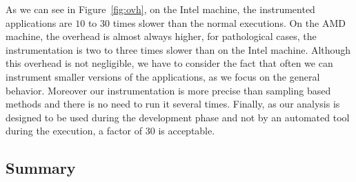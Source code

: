 
As we can see in Figure~\ref{fig:ovh}, on the Intel machine,
the instrumented applications are $10$ to $30$ times slower than the normal
executions. On the AMD machine, the overhead is almost always higher, for
pathological cases, the instrumentation is two to three times slower than on
the Intel machine.
Although this overhead is not negligible, we have to consider the fact that often we can instrument
smaller versions of the applications, as we focus on the general behavior.
Moreover our instrumentation is more precise than sampling based methods and
there is no need to run it several times. Finally, as our
analysis is designed to be used during the development phase and not by an
automated tool during the execution, a factor of $30$ is acceptable.

\subsection{Summary}

